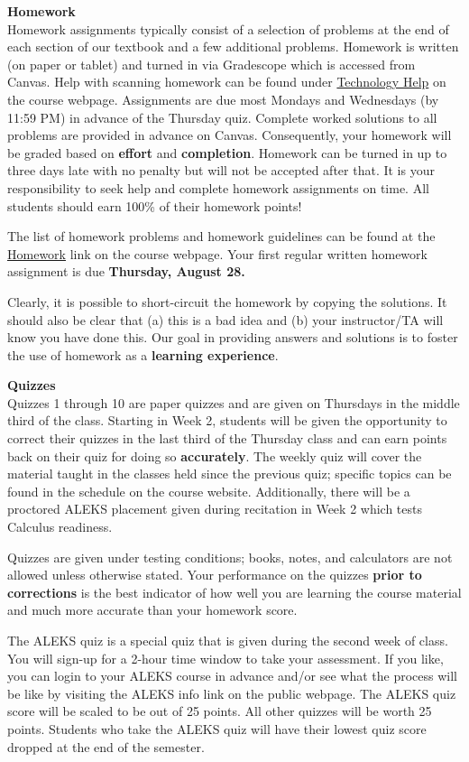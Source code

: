 \documentclass[12pt]{article}
\renewcommand{\emph}[1]{\textsf{\textbf{#1}}}
\newcommand{\localhead}[1]{\par\smallskip\textbf{#1}\nobreak\\}%
\def\heading#1{\localhead{\large\emph{#1}}}
\begin{document}
\heading{Homework}
Homework assignments typically consist of a selection of problems at
the end of each section of our textbook and a few additional
problems. Homework is written (on paper or tablet) and turned in via
Gradescope which is accessed from Canvas.  Help with scanning homework
can be found under
\href{https://uaf-math251.github.io/techHelp.html}{Technology Help} on
the course webpage. Assignments are due most Mondays and Wednesdays
(by 11:59 PM) in advance of the Thursday quiz. Complete worked
solutions to all problems are provided in advance on
Canvas. Consequently, your homework will be graded based on
\emph{effort} and \emph{completion}. Homework can be turned in up to
three days late with no penalty but will not be accepted after that.
It is your responsibility to seek help and complete homework
assignments on time.
 All students should earn
100\% of their homework points!

The list of homework problems and homework guidelines can be found at the \href{https://uaf-math251.github.io/newhomework.html}{Homework} link on the course webpage. Your first regular written homework assignment is due \emph{Thursday, August 28.}

Clearly, it is possible to short-circuit the homework by copying the solutions. It should also be clear that (a) this is a bad idea and (b) your instructor/TA will know you have done this. Our goal in providing answers and solutions is to foster the use of homework as a \emph{learning experience}. 



\heading{Quizzes}
Quizzes 1 through 10 are paper quizzes and are given on Thursdays in the middle third of the class. Starting in Week 2, students will be given the opportunity to correct their quizzes in the last third of the Thursday class and can earn points back on their quiz for doing so \emph{accurately}. The weekly quiz will cover the material taught in the classes held since the previous quiz; specific topics can be found in the schedule on the course website. Additionally, there will be a proctored ALEKS placement given during recitation in Week 2 which tests Calculus readiness.

Quizzes are given under testing conditions; books, notes, and calculators are not allowed unless otherwise stated. Your performance on the quizzes \emph{prior to corrections} is the best indicator of how well you are learning the course material and much more accurate than your homework score.

The ALEKS quiz is a special quiz that is given during the second week of class. You will sign-up for a 2-hour time window to take your assessment. If you like, you can login to your ALEKS course in advance and/or see what the process will be like by visiting the ALEKS info link on the public webpage. The ALEKS quiz score will be scaled to be out of 25 points. All other quizzes will be worth 25 points. Students who take the ALEKS quiz will have their lowest quiz score dropped at the end of the semester.
\end{document}
